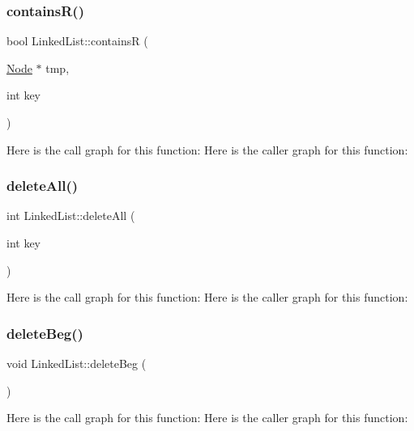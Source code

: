 \subsubsection{\texorpdfstring{contains\+R()}{containsR()}}
{\footnotesize\ttfamily bool Linked\+List\+::containsR (\begin{DoxyParamCaption}\item[{\hyperlink{class_node}{Node} $\ast$}]{tmp,  }\item[{int}]{key }\end{DoxyParamCaption})}

Here is the call graph for this function\+:
Here is the caller graph for this function\+:
\mbox{\label{class_linked_list_a8b00d7145aa7ee83ba2e49623285e371}} 
\subsubsection{\texorpdfstring{delete\+All()}{deleteAll()}}
{\footnotesize\ttfamily int Linked\+List\+::delete\+All (\begin{DoxyParamCaption}\item[{int}]{key }\end{DoxyParamCaption})}

Here is the call graph for this function\+:
Here is the caller graph for this function\+:
\mbox{\label{class_linked_list_af8ccdfe634eed9feae0c641766e2e867}} 
\subsubsection{\texorpdfstring{delete\+Beg()}{deleteBeg()}}
{\footnotesize\ttfamily void Linked\+List\+::delete\+Beg (\begin{DoxyParamCaption}{ }\end{DoxyParamCaption})}

Here is the call graph for this function\+:
Here is the caller graph for this function\+:
\mbox{\label{class_linked_list_ab624ff78c70aaa517a3a98a4e7fec288}} 
